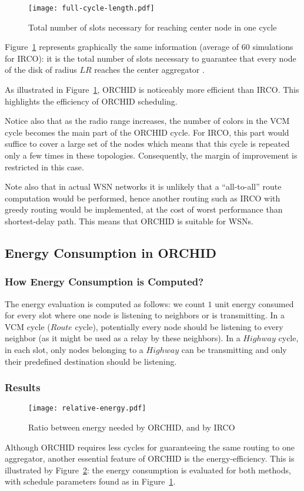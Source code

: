 \begin{figure}[!h]
\centering
\texttt{[image: full-cycle-length.pdf]}\caption{Total number of slots necessary for reaching center node in one cycle}\label{fig:orchid-result}
\end{figure}

Figure~\ref{fig:orchid-result} represents graphically the same information (average of $60$ simulations for IRCO): it is the total
number of slots necessary to guarantee that every node of the disk of radius $LR$ reaches the center aggregator \OO.

As illustrated in Figure~\ref{fig:orchid-result}, ORCHID is noticeably more efficient than IRCO. This highlights the efficiency of ORCHID scheduling. 

Notice also that as the radio range increases, the number of colors in the VCM cycle becomes the main part of the ORCHID cycle. For IRCO, this part would suffice to cover a large set of the nodes which means that this cycle is repeated only a few times in these topologies. Consequently, the margin of improvement is restricted in this case.
 
 

Note also that in actual WSN networks it is unlikely that a ``all-to-all'' route computation would be performed, hence another routing
such as IRCO with greedy routing would be implemented, at the
cost of worst performance than shortest-delay path. This means that ORCHID is suitable for WSNs.




\subsection{Energy Consumption in ORCHID}
\subsubsection{How Energy Consumption is Computed?}
The energy evaluation is computed as follows:
we count $1$ unit energy consumed 
for every slot where one node is listening to neighbors or is transmitting.
In a VCM cycle ($Route$ cycle), potentially every node should be listening
to every neighbor (as it might be used as a relay by these neighbors). In a $Highway$ cycle, in each slot, only nodes belonging to a $Highway$ can be transmitting and only their predefined destination should be listening.

\subsubsection{Results}
\begin{figure}[!h]
\centering
\texttt{[image: relative-energy.pdf]}\caption{Ratio between energy needed by ORCHID, and by IRCO}\label{fig:energy}
\end{figure}
Although ORCHID requires less cycles for guaranteeing the same routing to one aggregator, another essential feature of ORCHID is the energy-efficiency. This is illustrated by Figure~\ref{fig:energy}: the energy consumption is evaluated for both methods, with schedule parameters  found as in Figure~\ref{fig:orchid-result}. 

